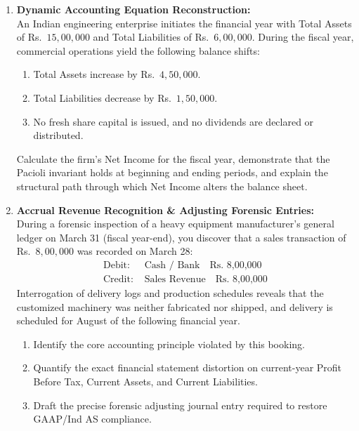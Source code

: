 \begin{enumerate}[label=\textbf{P1.\arabic*}]
    \item \textbf{Dynamic Accounting Equation Reconstruction:}\\
    An Indian engineering enterprise initiates the financial year with Total Assets of Rs.~$15{,}00{,}000$ and Total Liabilities of Rs.~$6{,}00{,}000$. During the fiscal year, commercial operations yield the following balance shifts:
    \begin{enumerate}[label=(\alph*)]
        \item Total Assets increase by Rs.~$4{,}50{,}000$.
        \item Total Liabilities decrease by Rs.~$1{,}50{,}000$.
        \item No fresh share capital is issued, and no dividends are declared or distributed.
    \end{enumerate}
    Calculate the firm's Net Income for the fiscal year, demonstrate that the Pacioli invariant holds at beginning and ending periods, and explain the structural path through which Net Income alters the balance sheet.

    \item \textbf{Accrual Revenue Recognition \& Adjusting Forensic Entries:}\\
    During a forensic inspection of a heavy equipment manufacturer's general ledger on March 31 (fiscal year-end), you discover that a sales transaction of Rs.~$8{,}00{,}000$ was recorded on March 28:
    \begin{align*}
    \text{Debit: } & \text{Cash / Bank} \quad \text{Rs.~8,00,000} \\
    \text{Credit: } & \text{Sales Revenue} \quad \text{Rs.~8,00,000}
    \end{align*}
    Interrogation of delivery logs and production schedules reveals that the customized machinery was neither fabricated nor shipped, and delivery is scheduled for August of the following financial year.
    \begin{enumerate}[label=(\alph*)]
        \item Identify the core accounting principle violated by this booking.
        \item Quantify the exact financial statement distortion on current-year Profit Before Tax, Current Assets, and Current Liabilities.
        \item Draft the precise forensic adjusting journal entry required to restore GAAP/Ind AS compliance.
    \end{enumerate}


\end{enumerate}
